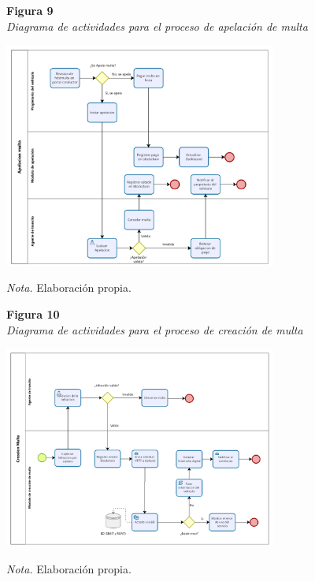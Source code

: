 \begin{figure}[htbp]
    \begin{flushleft}
        \textbf{Figura 9}\\
        \textit{Diagrama de actividades para el proceso de apelación de multa}
    \end{flushleft}
    \centering
    \includegraphics[width=0.8\textwidth]{Images/ActApelacion.png}
    \vspace{0.5em}
    \begin{flushleft}
        \textit{Nota.} Elaboración propia.
    \end{flushleft}
    \label{fig:diagrama_apelacion}
\end{figure}

\begin{figure}[htbp]
    \begin{flushleft}
        \textbf{Figura 10}\\
        \textit{Diagrama de actividades para el proceso de creación de multa}
    \end{flushleft}
    \centering
    \includegraphics[width=0.8\textwidth]{Images/ActMulta.png}
    \vspace{0.5em}
    \begin{flushleft}
        \textit{Nota.} Elaboración propia.
    \end{flushleft}
    \label{fig:diagrama_creacion_multa}
\end{figure}

